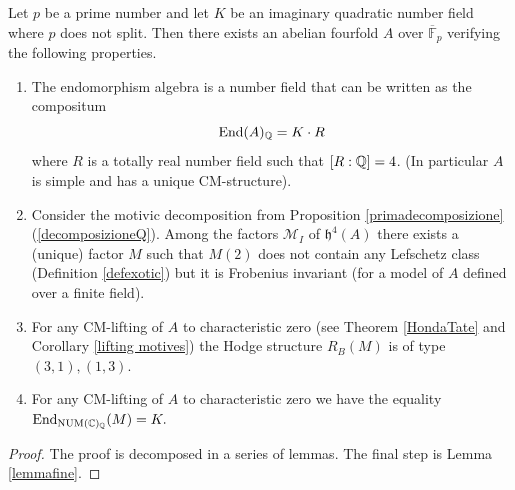 \begin{proposition}
\notready\label{propexemple}
Let $p$ be a prime number and  let $K$ be an  imaginary quadratic number field where $p$ does not split. Then there exists an abelian fourfold $A$ over $\overline{\mathbb{F}}_p$ verifying the following properties.
\begin{enumerate}
\item The endomorphism  algebra is a number field that can be written as the compositum \[\textnormal{End} (A)_{\mathbb{Q}} = K \cdot R\] where $R$ is a totally real number field such that $[R:\mathbb{Q}]=4$.
(In particular $A$ is simple and has a unique CM-structure).
\item Consider the motivic decomposition from Proposition \ref{primadecomposizione}(\ref{decomposizioneQ}). Among the factors $\mathcal{M}_I$ of $\mathfrak{h}^4(A)$ there exists a (unique) factor $M$  such that $M(2)$ does not contain any Lefschetz class (Definition \ref{defexotic}) but it is Frobenius invariant (for a model of $A$ defined over a finite field).
\item\label{cond2} For any CM-lifting  of $A$ to characteristic zero (see Theorem \ref{HondaTate} and Corollary \ref{lifting motives}) the Hodge structure $R_B(M)$ is of type $(3,1),(1,3)$.
\item\label{cond1} For any CM-lifting  of $A$ to characteristic zero we have the equality $\textnormal{End}_{\mathrm{NUM}(\mathbb{C})_{\mathbb{Q}}}  (M) = K.$
\end{enumerate}
\end{proposition}
\begin{proof}
The proof is decomposed in a series of lemmas. The final step is Lemma \ref{lemmafine}.
\end{proof}
